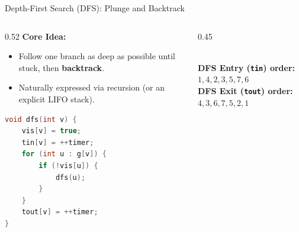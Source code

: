 \documentclass{beamer}
\begin{document}
\begin{frame}[fragile]{Depth-First Search (DFS): Plunge and Backtrack}
  \begin{columns}[c]
    \begin{column}{0.52\textwidth}
      \textbf{Core Idea:}
      \begin{itemize}
        \item Follow one branch as deep as possible until stuck, then \textbf{backtrack}.
        \item Naturally expressed via recursion (or an explicit LIFO stack).
      \end{itemize}
\begin{lstlisting}[language=C++]
void dfs(int v) {
    vis[v] = true;
    tin[v] = ++timer;
    for (int u : g[v]) {
        if (!vis[u]) {
            dfs(u);
        }
    }
    tout[v] = ++timer;
}
\end{lstlisting}
    \end{column}
    \begin{column}{0.45\textwidth}
      \centering
      \\[4pt]
      {\scriptsize
      \textbf{DFS Entry (\texttt{tin}) order:} $1, 4, 2, 3, 5, 7, 6$\\
      \textbf{DFS Exit (\texttt{tout}) order:} $4, 3, 6, 7, 5, 2, 1$}
    \end{column}
  \end{columns}
\end{frame}
\end{document}
